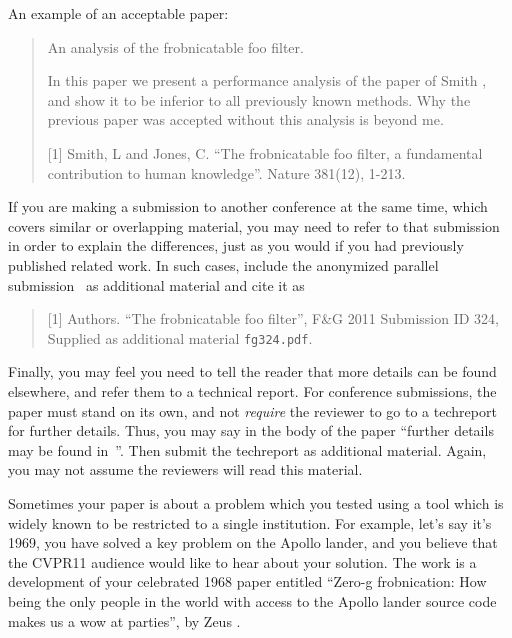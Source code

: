 \documentclass[10pt,twocolumn,letterpaper]{article}
\begin{document}
An example of an acceptable paper:

\begin{quote}
\begin{center}
     An analysis of the frobnicatable foo filter.
\end{center}

   In this paper we present a performance analysis of the
   paper of Smith \etal [1], and show it to be inferior to
   all previously known methods.  Why the previous paper
   was accepted without this analysis is beyond me.

   [1] Smith, L and Jones, C. ``The frobnicatable foo
   filter, a fundamental contribution to human knowledge''.
   Nature 381(12), 1-213.
\end{quote}

If you are making a submission to another conference at the same time,
which covers similar or overlapping material, you may need to refer to that
submission in order to explain the differences, just as you would if you
had previously published related work.  In such cases, include the
anonymized parallel submission~\cite{Authors11} as additional material and
cite it as
\begin{quote}
[1] Authors. ``The frobnicatable foo filter'', F\&G 2011 Submission ID 324,
Supplied as additional material {\tt fg324.pdf}.
\end{quote}

Finally, you may feel you need to tell the reader that more details can be
found elsewhere, and refer them to a technical report.  For conference
submissions, the paper must stand on its own, and not {\em require} the
reviewer to go to a techreport for further details.  Thus, you may say in
the body of the paper ``further details may be found
in~\cite{Authors11b}''.  Then submit the techreport as additional material.
Again, you may not assume the reviewers will read this material.

Sometimes your paper is about a problem which you tested using a tool which
is widely known to be restricted to a single institution.  For example,
let's say it's 1969, you have solved a key problem on the Apollo lander,
and you believe that the CVPR11 audience would like to hear about your
solution.  The work is a development of your celebrated 1968 paper entitled
``Zero-g frobnication: How being the only people in the world with access to
the Apollo lander source code makes us a wow at parties'', by Zeus \etal.
\end{document}
